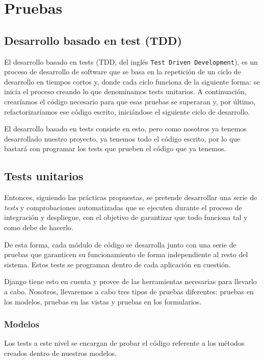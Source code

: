 \chapter{Pruebas}
\label{cap:pruebas}

\section{Desarrollo basado en  test (TDD)}
El desarrollo basado en tests (TDD, del inglés \texttt{Test Driven Development}), es un proceso de desarrollo de software que se basa en la repetición de un ciclo de desarrollo en tiempos cortos y, donde cada ciclo funciona de la siguiente forma: se inicia el proceso creando lo que denominamos tests unitarios. A continuación, crearíamos el código necesario para que esas pruebas se superaran y, por último, refactorizaríamos ese código escrito, iniciándose el siguiente ciclo de desarrollo.

El desarrollo basado en tests consiste en esto, pero como nosotros ya tenemos desarrollado nuestro proyecto, ya tenemos todo el código escrito, por lo que bastará con programar los tests que prueben el código que ya tenemos.

\section{Tests unitarios}
Entonces, siguiendo las prácticas propuestas, se pretende desarrollar una serie de \textit{tests} y comprobaciones automatizadas que se ejecuten durante el proceso de integración y despliegue, con el objetivo de garantizar que todo funciona tal y como debe de hacerlo. 

De esta forma, cada módulo de código se desarrolla junto con una serie de pruebas que garanticen su funcionamiento de forma independiente al resto del sistema. Estos tests se programan dentro de cada aplicación en cuestión.

Django tiene esto en cuenta \cite{DjTest} y provee de las herramientas necesarias para llevarlo a cabo. Nosotros, llevaremos a cabo tres tipos de pruebas diferentes: pruebas en los modelos, pruebas en las vistas y pruebas en los formularios.

\subsection{Modelos}

Los tests a este nivel se encargan de probar el código referente a los métodos creados dentro de nuestros modelos.

